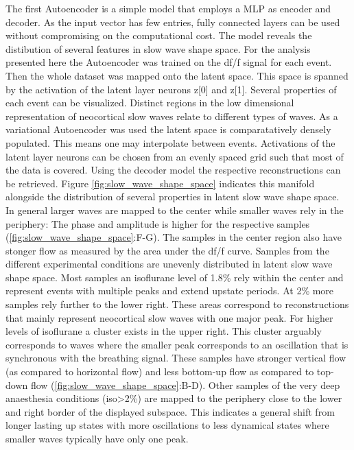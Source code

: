 The first Autoencoder is a simple model that employs a MLP as encoder and decoder. As the input vector has few entries, fully connected layers can be used without compromising on the computational cost. The model reveals the distibution of several features in slow wave shape space. For the analysis presented here the Autoencoder was trained on the df/f signal for each event. Then the whole dataset was mapped onto the latent space. This space is spanned by the activation of the latent layer neurons z[0] and z[1]. Several properties of each event can be visualized. Distinct regions in the low dimensional representation of neocortical slow waves relate to different types of waves. As a variational Autoencoder was used the latent space is comparatatively densely populated. This means one may interpolate between events. Activations of the latent layer neurons can be chosen from an evenly spaced grid such that most of the data is covered. Using the decoder model the respective reconstructions can be retrieved. Figure \ref{fig:slow_wave_shape_space} indicates this manifold alongside the distribution of several properties in latent slow wave shape space.\\
In general larger waves are mapped to the center while smaller waves rely in the periphery: The phase and amplitude is higher for the respective samples (\ref{fig:slow_wave_shape_space}:F-G). The samples in the center region also have stonger flow as measured by the area under the df/f curve. Samples from the different experimental conditions are unevenly distributed in latent slow wave shape space. Most samples an isoflurane level of 1.8\% rely within the center and represent events with multiple peaks and extend upstate periods. At 2\% more samples rely further to the lower right. These areas correspond to reconstructions that mainly represent neocortical slow waves with one major peak. For higher levels of isoflurane a cluster exists in the upper right. This cluster arguably corresponds to waves where the smaller peak corresponds to an oscillation that is synchronous with the breathing signal. These samples have stronger vertical flow (as compared to horizontal flow) and less bottom-up flow as compared to top-down flow (\ref{fig:slow_wave_shape_space}:B-D). Other samples of the very deep anaesthesia conditions (iso>2\%) are mapped to the periphery close to the lower and right border of the displayed subspace. This indicates a general shift from longer lasting up states with more oscillations to less dynamical states where smaller waves typically have only one peak.\\

